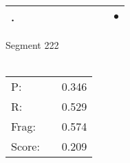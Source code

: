 \documentclass[landscape]{article}
\newcommand{\ssp}{\hspace{2pt}}
\newcommand{\mex}{\cellcolor{g}$\bullet$}
\begin{document}
\begin{tabular}{|l|p{10pt}|p{10pt}|p{10pt}|p{10pt}|p{10pt}|p{10pt}|p{10pt}|p{10pt}|p{10pt}|}
\hline
\ssp \cellcolor{ref8}. \ssp&\hspace{2pt}&\hspace{2pt}&\hspace{2pt}&\hspace{2pt}&\hspace{2pt}&\hspace{2pt}&\hspace{2pt}&\hspace{2pt}&\hspace{2pt}\mex\\
\hline
\end{tabular}

\vspace{6pt}
\noindent Segment 222\\\\
\noindent\begin{tabular}{lm{12pt}r}
\hline
P:&&0.346\\
R:&&0.529\\
Frag:&&0.574\\
Score:&&0.209\\
\end{tabular}

\newpage
\end{document}
